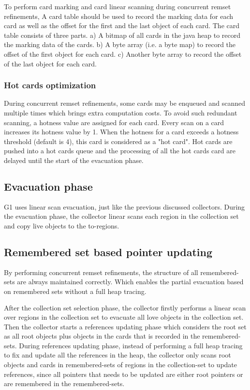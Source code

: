 To perform card marking and card linear scanning during concurrent remset refinements,
A card table should be used to record the marking data for each card as well as the offset
for the first and the last object of each card.
The card table consists of three parts. a) A bitmap of all cards in the java heap
to record the marking data of the cards. b) A byte array (i.e. a byte map) to record the
offset of the first object for each card. c) Another byte array to record the
offset of the last object for each card.

\subsubsection{Hot cards optimization}

During concurrent remset refinements, some cards may be enqueued and scanned multiple times
which brings extra computation costs. To avoid such redundant scanning,
a hotness value are assigned for each card. Every scan on a card increases its hotness value by 1.
When the hotness for a card exceeds a hotness threshold (default is 4), this card is considered
as a "hot card". Hot cards are pushed into a hot cards queue and the processing
of all the hot cards card are delayed until the start of the evacuation phase.

\subsection{Evacuation phase}

G1 uses linear scan evacuation, just like the previous discussed collectors.
During the evacuation phase, the collector linear scans each region in the collection
set and copy live objects to the to-regions.

\subsection{Remembered set based pointer updating}

By performing concurrent remset refinements, the structure of all remembered-sets are always maintained correctly.
Which enables the partial evacuation based on remembered sets without a full heap tracing.

After the collection set selection phase, the collector firstly performs a linear
scan over regions in the collection set to evacuate all love objects in the collection set.
Then the collector starts a references updating phase which considers
the root set as all root objects plus objects in the cards that is recorded in the remembered-sets.
During references updating phase, instead of performing a full heap tracing to fix and
update all the references in the heap, the collector only scans root objects and
cards in remembered-sets of regions in the collection-set to update references,
since all pointers that needs to be updated are either root pointers or are remembered in the remembered-sets.

